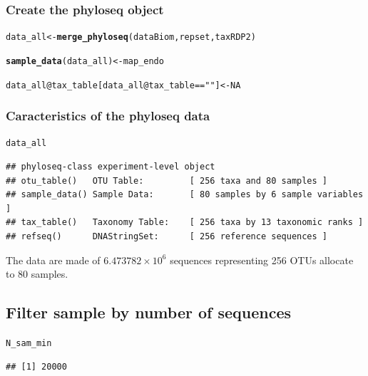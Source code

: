 \documentclass[12pt]{article}\usepackage[]{graphicx}\usepackage[]{color}
\makeatletter
\newcommand{\hlnum}[1]{\textcolor[rgb]{0.686,0.059,0.569}{#1}}%
\newcommand{\hlstr}[1]{\textcolor[rgb]{0.192,0.494,0.8}{#1}}%
\newcommand{\hlopt}[1]{\textcolor[rgb]{0,0,0}{#1}}%
\newcommand{\hlstd}[1]{\textcolor[rgb]{0.345,0.345,0.345}{#1}}%
\newcommand{\hlkwb}[1]{\textcolor[rgb]{0.69,0.353,0.396}{#1}}%
\newcommand{\hlkwc}[1]{\textcolor[rgb]{0.333,0.667,0.333}{#1}}%
\newcommand{\hlkwd}[1]{\textcolor[rgb]{0.737,0.353,0.396}{\textbf{#1}}}%
\newenvironment{kframe}{%
 \def\at@end@of@kframe{}%
 \ifinner\ifhmode%
  \def\at@end@of@kframe{\end{minipage}}%
  \begin{minipage}{\columnwidth}%
 \fi\fi%
 \def\FrameCommand##1{\hskip\@totalleftmargin \hskip-\fboxsep
 \colorbox{shadecolor}{##1}\hskip-\fboxsep
     \hskip-\linewidth \hskip-\@totalleftmargin \hskip\columnwidth}%
 \MakeFramed {\advance\hsize-\width
   \@totalleftmargin\z@ \linewidth\hsize
   \@setminipage}}%
 {\par\unskip\endMakeFramed%
 \at@end@of@kframe}
\newenvironment{knitrout}{}{} %
\numberwithin{figure}{section}
\makeatother
\begin{document}
 \subsubsection{Create the phyloseq object}

\begin{knitrout}\small
{}\color{fgcolor}\begin{kframe}
\begin{alltt}
\hlstd{data_all} \hlkwb{<-} \hlkwd{merge_phyloseq}\hlstd{(dataBiom, repset, taxRDP2)}

\hlkwd{sample_data}\hlstd{(data_all)} \hlkwb{<-} \hlstd{map_endo}

\hlstd{data_all}\hlopt{@}\hlkwc{tax_table}\hlstd{[data_all}\hlopt{@}\hlkwc{tax_table} \hlopt{==} \hlstr{""}\hlstd{]} \hlkwb{<-} \hlnum{NA}
\end{alltt}
\end{kframe}
\end{knitrout}

\subsubsection{Caracteristics of the phyloseq data}

\begin{knitrout}\small
{}\color{fgcolor}\begin{kframe}
\begin{alltt}
\hlstd{data_all}
\end{alltt}
\begin{verbatim}
## phyloseq-class experiment-level object
## otu_table()   OTU Table:         [ 256 taxa and 80 samples ]
## sample_data() Sample Data:       [ 80 samples by 6 sample variables ]
## tax_table()   Taxonomy Table:    [ 256 taxa by 13 taxonomic ranks ]
## refseq()      DNAStringSet:      [ 256 reference sequences ]
\end{verbatim}
\end{kframe}
\end{knitrout}

The data are made of \ensuremath{6.473782\times 10^{6}} sequences representing 256 OTUs allocate to 80 samples.

  \subsection{Filter sample by number of sequences}

\begin{knitrout}\small
{}\color{fgcolor}\begin{kframe}
\begin{alltt}
\hlstd{N_sam_min}
\end{alltt}
\begin{verbatim}
## [1] 20000
\end{verbatim}
\end{kframe}
\end{knitrout}
\end{document}
